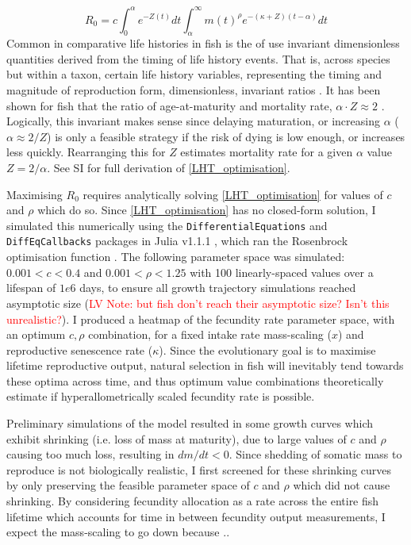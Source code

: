 \documentclass[a4paper]{article} %
\begin{document}
\begin{equation}
    R_{0} = c\int_{0}^{\alpha}e^{-Z(t)}dt\int_{\alpha}^{\infty} m(t)^{\rho} e^{-(\kappa+Z)(t-\alpha)} dt \label{LHT_optimisation}
\end{equation}
Common in comparative life histories in fish is the of use invariant dimensionless quantities derived from the timing of life history events. That is, across species but within a taxon, certain life history variables, representing the timing and magnitude of reproduction form, dimensionless, invariant ratios \autocite{Charnov1990-invariant, Charnov1993}. It has been shown for fish that the ratio of age-at-maturity and mortality rate, $\alpha\cdot Z \approx 2$ \autocite{Charnov1993}. Logically, this invariant makes sense since delaying maturation, or increasing $\alpha$ ($\alpha \approx 2/Z$) is only a feasible strategy if the risk of dying is low enough, or increases less quickly. Rearranging this for $Z$ estimates mortality rate for a given $\alpha$ value $Z = 2/\alpha$.
See SI for full derivation of \cref{LHT_optimisation}.

Maximising $R_0$ requires analytically solving \cref{LHT_optimisation} for values of $c$ and $\rho$ which do so. Since \cref{LHT_optimisation} has no closed-form solution, I simulated this numerically using the \texttt{DifferentialEquations} and \texttt{DiffEqCallbacks} packages in Julia v1.1.1 \autocite{Bezanson2017}, which ran the Rosenbrock optimisation function \autocite{Rosenbrock1960}. The following parameter space was simulated: $0.001 < c < 0.4$ and $0.001 < \rho < 1.25$  with 100 linearly-spaced values over a lifespan of $1e6$ days, to ensure all growth trajectory simulations reached asymptotic size (\textcolor{red}{LV Note: but fish don't reach their asymptotic size? Isn't this unrealistic?}). I produced a heatmap of the fecundity rate parameter space, with an optimum $c, \rho$ combination, for a fixed intake rate mass-scaling ($x$) and reproductive senescence rate ($\kappa$). Since the evolutionary goal is to maximise lifetime reproductive output, natural selection in fish will inevitably tend towards these optima across time, and thus optimum value combinations theoretically estimate if hyperallometrically scaled fecundity rate is possible.

Preliminary simulations of the model resulted in some growth curves which exhibit shrinking (i.e. loss of mass at maturity), due to large values of $c$ and $\rho$ causing too much loss, resulting in $dm/dt < 0$. Since shedding of somatic mass to reproduce is not biologically realistic, I first screened for these shrinking curves by only preserving the feasible parameter space of $c$ and $\rho$ which did not cause shrinking.
By considering fecundity allocation as a rate across the entire fish lifetime which accounts for time in between fecundity output measurements, I expect the mass-scaling to go down because ..
\end{document}
